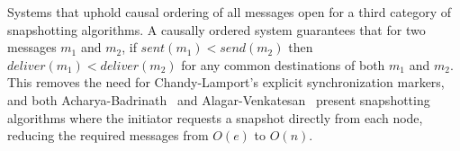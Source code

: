 Systems that uphold causal ordering of all messages open for a third category of
snapshotting algorithms. A causally ordered system guarantees that for two
messages $ m_1 $ and $ m_2 $, if $ sent(m_1) < send(m_2) $ then $ deliver(m_1) <
deliver(m_2) $ for any common destinations of both $ m_1 $ and $ m_2 $. This
removes the need for Chandy-Lamport's explicit synchronization markers, and both
Acharya-Badrinath~\cite{acharya} and Alagar-Venkatesan~\cite{alagar} present
snapshotting algorithms where the initiator requests a snapshot directly from
each node, reducing the required messages from $ O(e) $ to $ O(n) $.

